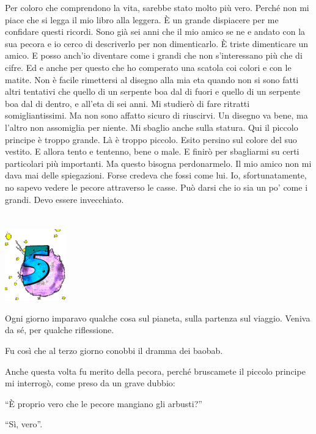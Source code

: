 \documentclass[11pt]{scrbook}
\begin{document}
Per coloro che comprendono la vita, sarebbe stato molto più vero. Perché non mi piace che si legga il mio libro alla leggera. È un grande dispiacere per me confidare questi ricordi. Sono già sei anni che il mio amico se ne e andato con la sua pecora e io cerco di descriverlo per non dimenticarlo. È triste dimenticare un amico. E posso anch'io diventare come i grandi che non s'interessano più che di cifre. Ed e anche per questo che ho comperato una scatola coi colori e con le matite. Non è facile rimettersi al disegno alla mia eta quando non si sono fatti altri tentativi che quello di un serpente boa dal di fuori e quello di un serpente boa dal di dentro, e all'eta di sei anni. Mi studierò di fare ritratti somigliantissimi. Ma non sono affatto sicuro di riuscirvi. Un disegno va bene, ma l'altro non assomiglia per niente. Mi sbaglio anche sulla statura. Qui il piccolo principe è troppo grande. Là è troppo piccolo. Esito persino sul colore del suo vestito. E allora tento e tentenno, bene o male. E finirò per sbagliarmi su certi particolari più importanti. Ma questo bisogna perdonarmelo. Il mio amico non mi dava mai delle spiegazioni. Forse credeva che fossi come lui. Io, sfortunatamente, no sapevo vedere le pecore attraverso le casse. Può darsi che io sia un po' come i grandi. Devo essere invecchiato.

\chapter{}
\begin{center}
\includegraphics{img/chapter5}
\end{center}

Ogni giorno imparavo qualche cosa sul pianeta, sulla partenza sul viaggio. Veniva da sé, per qualche riflessione.

Fu così che al terzo giorno conobbi il dramma dei baobab.

Anche questa volta fu merito della pecora, perché bruscamete il piccolo principe mi interrogò, come preso da un grave dubbio:

``È proprio vero che le pecore mangiano gli arbusti?''

``Sì, vero''.
\end{document}
